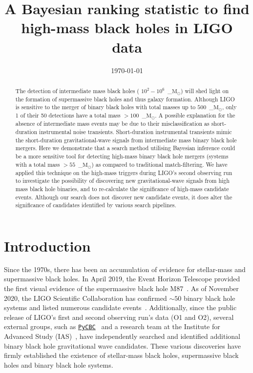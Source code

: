 \documentclass[%
 nofootinbib,
 amsmath,amssymb,
 aps,
 twocolumn
]{revtex4-2}
\newcommand{\pycbc}{{\sc \href{https://pycbc.org/}{\texttt{PyCBC}}}\xspace}
\newcommand{\mathcmd}[1]{{\sc \relax\ifmmode#1\else $#1$\fi}\xspace}
\newcommand{\msun}{\mathcmd{\text{M}_\odot}}
\begin{document}
\title{A Bayesian ranking statistic to find \\high-mass black holes in LIGO data}



\date{\today}

\begin{abstract}
The detection of intermediate mass black holes ( $10^2-10^6$~\msun) will shed light on the formation of supermassive black holes and thus galaxy formation. Although LIGO is sensitive to the merger of binary black holes with total masses up to $500$~\msun, only 1 of their 50 detections have a total mass $>100$~\msun. A possible explanation for the absence of intermediate mass events may be due to their misclassification as short-duration instrumental noise transients. Short-duration instrumental transients mimic the short-duration gravitational-wave signals from intermediate mass binary black hole mergers. Here we demonstrate that a search method utilising Bayesian inference could be a more sensitive tool for detecting high-mass binary black hole mergers (systems with a total mass $>55$~\msun) as compared to traditional match-filtering. We have applied this technique on the high-mass triggers during LIGO's second observing run to investigate the possibility of discovering new gravitational-wave signals from high mass black hole binaries, and to re-calculate the significance of high-mass candidate events. Although our search does not discover new candidate events, it does alter the significance of candidates identified by various search pipelines. 
\end{abstract}

\maketitle


\section{\label{sec:Introduction}Introduction}

Since the 1970s, there has been an accumulation of evidence for stellar-mass and supermassive black holes. In April 2019, the Event Horizon Telescope provided the first visual evidence of the supermassive black hole M87~\cite{m87photo}. As of November 2020, the LIGO Scientific Collaboration has confirmed $\sim50$ binary black hole systems and listed numerous candidate events~\cite{GWTC1, GWTC2, gracedb}. Additionally, since the public release of LIGO's first and second observing run's data (O1 and O2), several external groups, such as \pycbc~\cite{pycbc_code} and a research team at the Institute for Advanced Study (IAS)~\cite{IAS0, IAS1, IAS2}, have independently searched and identified additional binary black hole gravitational wave candidates. These various discoveries have firmly established the existence of stellar-mass black holes, supermassive black holes and binary black hole systems.
\end{document}
